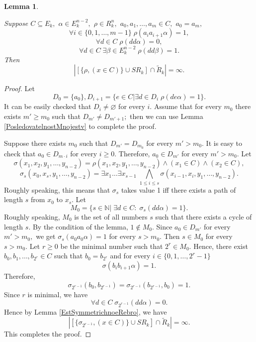 \documentclass{au}
\theoremstyle{plain}
\newtheorem{lemma}{Lemma}
\theoremstyle{definition}
\theoremstyle{remark}
\numberwithin{equation}{section}
\begin{document}
\begin{lemma}\label{EstCykl}

Suppose
$C\subseteq E_{k},$
$\alpha \in E_{k}^{n-2},$
$\rho \in R_{k}^{n},$
$a_{0},a_{1},\ldots,a_{m}\in C,$ $a_{0} = a_{m},$
$$\forall i\in \{0,1,\ldots,m-1\} \; \rho(a_{i} a_{i+1}\alpha) =  1,$$
$$\forall d \in C \; \rho(d d \alpha) =  0,$$
$$\forall d \in C\; \exists \beta \in E_{k}^{n-2} \; \rho(d d \beta) =  1.$$
Then $$|[\{\rho,(x\in C)\} \cup SR_{k} ]\cap \widetilde R_{k}| = \infty.$$
\end{lemma}

\begin{proof}

Let
$$D_{0} = \{a_{0}\},
D_{i+1} = \{e\in C | \exists d \in D_{i}\; \rho(d e \alpha)  =1 \}.$$
It can be easily checked that $D_{i}\neq \varnothing$ for every $i.$
Assume that for every $m_{0}$ there exists $m'\ge m_{0}$ such that $D_{m'}\neq D_{m'+1};$
then we can use Lemma \ref{PosledovatelnostMnojestv} to complete the proof.

Suppose there exists $m_{0}$ such that $D_{m'} = D_{m_{0}}$  for every $m'>m_{0}.$
It is easy to check that $a_{0}\in D_{m\cdot i}$ for every $i\ge 0.$
Therefore, $a_{0}\in D_{m'}$  for every $m'>m_{0}.$
Let
$$\sigma(x_{1}, x_{2},y_{1},\ldots,y_{n-2}) = \rho(x_{1}, x_{2},y_{1},\ldots,y_{n-2}) \wedge (x_{1}\in C) \wedge 
(x_{2}\in C),$$
$$\sigma_{s}(x_{0},x_{s},y_{1},\ldots,y_{n-2}) =
\exists x_{1} \ldots\exists x_{s-1}\;
\bigwedge \limits_{1\le i\le s}
\sigma(x_{i-1}, x_{i},y_{1},\ldots,y_{n-2}).$$
Roughly speaking, this means that $\sigma_{s}$ takes value 1 iff there exists a path of length $s$ from
$x_{0}$ to $x_{s}.$
Let
$$M_{0} = \{ s\in \mathbb N| \;\exists d\in C:\; \sigma_{s}(d d \alpha) = 1\}.$$
Roughly speaking, $M_{0}$ is the set of all numbers $s$ such that
there exists a cycle of length $s.$
By the condition of the lemma, $1\notin M_{0}.$
Since $a_{0}\in D_{m'}$  for every $m'>m_{0},$
we get
$\sigma_{s}(a_{0} a_{0} \alpha) = 1$
for every $s>m_{0}.$ Then $s\in M_{0}$ for every $s>m_{0}.$
Let $r\ge 0$ be the minimal number such that $2^{r}\in M_{0}.$
Hence, there exist
$b_{0},b_{1},\ldots,b_{2^{r}}\in C$
such that  $b_{0} = b_{2^{r}}$ and for every $i\in \{0,1,\ldots,2^{r}-1\}$
$$\sigma(b_{i} b_{i+1}\alpha) =  1.$$
Therefore, 
$$\sigma_{2^{r-1}}(b_{0},b_{2^{r-1}}) =  \sigma_{2^{r-1}}(b_{2^{r-1}}, b_{0}) =1.$$
Since $r$ is minimal, we have 
$$\forall d \in C \; \sigma_{2^{r-1}}(d d \alpha) =  0.$$
Hence by Lemma \ref{EstSymmetrichnoeRebro},
we have
$$|[\{\sigma_{2^{r-1}},(x\in C)\} \cup SR_{k} ]\cap \widetilde R_{k}| = \infty.$$
This completes the proof.

\end{proof}
\end{document}

